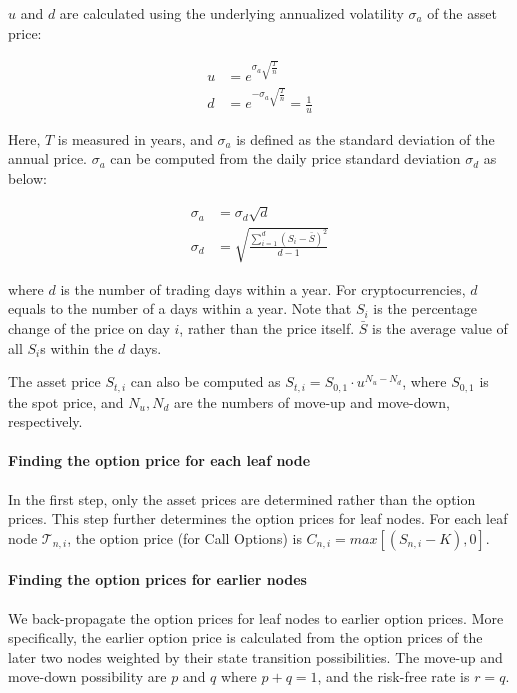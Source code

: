 $u$ and $d$ are calculated using the underlying annualized volatility $\sigma_a$ of the asset price:

\begin{align} 
u &= e^{\sigma_a \sqrt{\frac{T}{n}}}\\
d &= e^{- \sigma_a \sqrt{\frac{T}{n}}} = \frac{1}{u}
\end{align}

Here, $T$ is measured in years, and $\sigma_a$ is defined as the standard deviation of the annual price.
$\sigma_a$ can be computed from the daily price standard deviation $\sigma_d$ as below:

\begin{align} 
\sigma_a &= \sigma_d \sqrt{d}\\
\sigma_d &= \sqrt{\frac{\sum^{d}_{i=1} (S_i - \bar{S})^2}{d-1}}
\end{align}

where $d$ is the number of trading days within a year.
For cryptocurrencies, $d$ equals to the number of a days within a year.
Note that $S_i$ is the percentage change of the price on day $i$, rather than the price itself.
$\bar{S}$ is the average value of all $S_i$s within the $d$ days. 

The asset price $S_{t, i}$ can also be computed as $S_{t, i} = S_{0, 1} \cdot u^{N_u - N_d}$, where $S_{0, 1}$ is the spot price, and $N_u, N_d$ are the numbers of move-up and move-down, respectively.

\paragraph{Finding the option price for each leaf node}
In the first step, only the asset prices are determined rather than the option prices.
This step further determines the option prices for leaf nodes.
For each leaf node $\mathcal{T}_{n, i}$, the option price (for Call Options) is $C_{n, i} = max[(S_{n, i} - K), 0]$.

\paragraph{Finding the option prices for earlier nodes}
We back-propagate the option prices for leaf nodes to earlier option prices.
More specifically, the earlier option price is calculated from the option prices of the later two nodes weighted by their state transition possibilities.
The move-up and move-down possibility are $p$ and $q$ where $p + q = 1$, and the risk-free rate is $r = q$.

